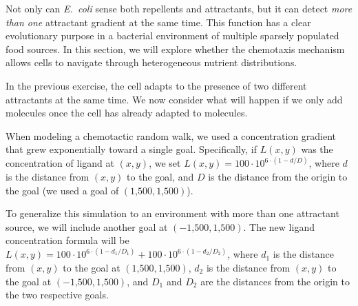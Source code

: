 Not only can \textit{E.~coli} sense both repellents and attractants, but it can detect \textit{more than one} attractant gradient at the same time.  This function has a clear evolutionary purpose in a bacterial environment of multiple sparsely populated food sources. In this section, we will explore whether the chemotaxis mechanism allows cells to navigate through heterogeneous nutrient distributions.\\

\begin{exercise}\end{exercise}

In the previous exercise, the cell adapts to the presence of two different attractants at the same time. We now consider what will happen if we only add  molecules once the cell has already adapted to  molecules.\\

\begin{exercise}\end{exercise}

When modeling a chemotactic random walk, we used a concentration gradient that grew exponentially toward a single goal. Specifically, if $L(x,y)$ was the concentration of ligand at $(x, y)$, we set $L(x,y) = 100 \cdot 10^{6 \cdot (1-d/D)}$, where $d$ is the distance from $(x,y)$ to the goal, and $D$ is the distance from the origin to the goal (we used a goal of $(\text{1,500}, \text{1,500})$).

To generalize this simulation to an environment with more than one attractant source, we will include another goal at $(-\text{1,500}, \text{1,500})$. The new ligand concentration formula will be $L(x, y) = 100 \cdot 10^{6 \cdot (1-d_1/D_1)} + 100 \cdot 10^{6 \cdot (1-d_2/D_2)}$, where $d_1$ is the distance from $(x, y)$ to the goal at $(\text{1,500}, \text{1,500})$, $d_2$ is the distance from $(x, y)$ to the goal at $(-\text{1,500}, \text{1,500})$, and $D_1$ and $D_2$ are the distances from the origin to the two respective goals.\\

